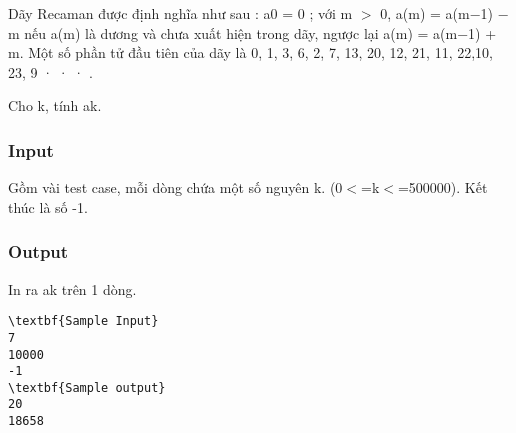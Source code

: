 

Dãy Recaman được định nghĩa như sau : a0 = 0 ; với m $>$ 0, a(m) = a(m−1) − m nếu a(m) là dương và chưa xuất hiện trong dãy, ngược lại a(m) = a(m−1) + m. Một số phần tử đầu tiên của dãy là 0, 1, 3, 6, 2, 7, 13, 20, 12, 21, 11, 22,10, 23, 9 · · · .

Cho k, tính ak.

\subsubsection{Input}

Gồm vài test case, mỗi dòng chứa một số nguyên k. (0$<$=k$<$=500000). Kết thúc là số -1.

\subsubsection{Output}

In ra ak trên 1 dòng.
\begin{verbatim}
\textbf{Sample Input}
7
10000
-1
\textbf{Sample output}
20
18658
\end{verbatim}